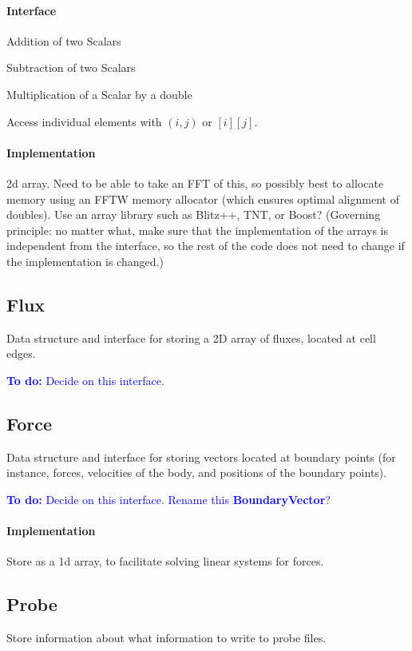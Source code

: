 \documentclass[11pt]{article}
\def\todo#1{\textcolor{blue}{{\bf To do:} #1}}
\def\class#1{{\bf #1}} %
\begin{document}
\paragraph{Interface}
\begin{description}
	\item Addition of two Scalars
	\item Subtraction of two Scalars
	\item Multiplication of a Scalar by a double
	\item Access individual elements with $(i,j)$ or $[i][j]$.
\end{description}

\paragraph{Implementation}
2d array.  Need to be able to take an FFT of this, so possibly best to allocate memory using an FFTW memory allocator (which ensures optimal alignment of doubles).  Use an array library such as Blitz++, TNT, or Boost?  (Governing principle: no matter what, make sure that the implementation of the arrays is independent from the interface, so the rest of the code does not need to change if the implementation is changed.)

\subsection{Flux}
Data structure and interface for storing a 2D array of fluxes, located at cell edges.

\todo{Decide on this interface.}

\subsection{Force}
Data structure and interface for storing vectors located at boundary points (for instance, forces, velocities of the body, and positions of the boundary points).

\todo{Decide on this interface.  Rename this \class{BoundaryVector}?}

\paragraph{Implementation}
Store as a 1d array, to facilitate solving linear systems for forces.

\subsection{Probe}
Store information about what information to write to probe files.
\end{document}
